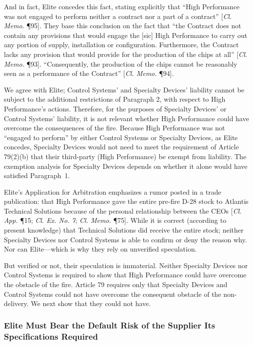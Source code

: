 And in fact, Elite concedes this fact, stating explicitly that ``High Performance was not engaged to perform neither a contract nor a part of a contract'' [\textit{Cl. Memo.} \P95]. They base this conclusion on the fact that ``the Contract does not contain any provisions that would engage the [sic] High Performance to carry out any portion of supply, installation or configuration. Furthermore, the Contract lacks any provision that would provide for the production of the chips at all'' [\textit{Cl. Memo.} \P93]. ``Consequently, the production of the chips cannot be reasonably seen as a performance of the Contract'' [\textit{Cl. Memo.} \P94]. 

We agree with Elite; Control Systems' and Specialty Devices' liability cannot be subject to the additional restrictions of Paragraph 2, with respect to High Performance's actions.  Therefore, for the purposes of Specialty Devices' or Control Systems' liability, it is not relevant whether High Performance could have overcome the consequences of the fire.  Because High Performance was not ``engaged to perform'' by either Control Systems or Specialty Devices, as Elite concedes, Specialty Devices would not need to meet the requirement of Article 79(2)(b) that their third-party (High Performance) be exempt from liability. The exemption analysis for Specialty Devices depends on whether it alone would have satisfied Paragraph~1. 

Elite's Application for Arbitration emphasizes a rumor posted in a trade publication: that High Performance gave the entire pre-fire D-28 stock to Atlantis Technical Solutions because of the personal relationship between the CEOs [\textit{Cl. App.} \P 15; \textit{Cl. Ex. No. 7}; \textit{Cl. Memo.} \P75]. While it is correct (according to present knowledge) that Technical Solutions did receive the entire stock; neither Specialty Devices nor Control Systems is able to confirm or deny the reason why. Nor can Elite---which is why they rely on unverified speculation. 

But verified or not, their speculation is immaterial. Neither Specialty Devices nor Control Systems is required to show that High Performance could have overcome the obstacle of the fire. Article 79 requires only that Specialty Devices and Control Systems could not have overcome the consequent obstacle of the non-delivery. We next show that they could not have. 
 



\subsubsection{Elite Must Bear the Default Risk of the Supplier Its Specifications Required} 

